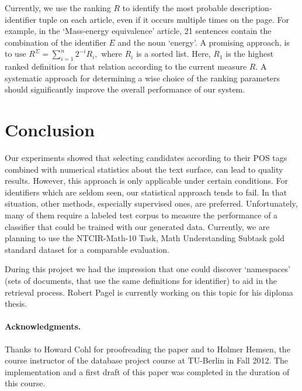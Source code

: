 \documentclass[runningheads]{llncs}
\begin{document}
Currently, we use the ranking $R$ to identify the most probable description-
identifier tuple on each article, even if it occurs multiple times on the page.
For example, in the `Mass-energy equivalence' article, 21 sentences contain the
combination of the identifier $E$ and the noun `energy'. A promising approach,
is to use $R^\Sigma=\sum_{i=1}^n 2^{-i} R_i,$ where $R_i$ is a sorted list.
Here, $R_1$ is the highest ranked definition for that relation according to the
current measure $R$.  A systematic approach for determining a wise choice of the
ranking parameters should significantly improve the overall performance of our
system.


\section{Conclusion}

Our experiments showed that selecting candidates according to their POS tags
combined with numerical statistics about the text surface, can lead to quality
results. However, this approach is only applicable under certain conditions.
For identifiers which are seldom seen, our statistical approach tends to fail.
In that situation, other methods, especially supervised ones, are preferred.
Unfortunately, many of them require a labeled test corpus to measure the
performance of a classifier that could be trained with our generated data.
Currently, we are planning to use the NTCIR-Math-10 Task, Math Understanding
Subtask gold standard dataset \cite{overview} for a comparable evaluation.

During this project we had the impression that one could discover `namespaces'
(sets of documents, that use the same definitions for identifier) to aid in
the retrieval process. Robert Pagel is currently working on this topic
for his diploma thesis.


\paragraph*{Acknowledgments.}

Thanks to Howard Cohl for proofreading the paper and to Holmer Hemsen, the
course instructor of the database project course at TU-Berlin in Fall 2012.
The implementation and a first draft of this paper was completed in the
duration of this course.

\begingroup
\let\clearpage\relax

\endgroup
\end{document}
